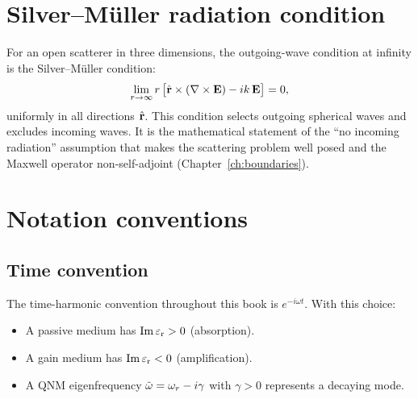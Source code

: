\section{Silver--M\"uller radiation condition}
\label{sec:silver-muller}

For an open scatterer in three dimensions, the outgoing-wave condition
at infinity is the Silver--M\"uller condition:
\begin{equation}
 \lim_{r\to\infty} r\,\bigl[
 \hat{\mathbf{r}}\times(\nabla\times\mathbf{E}) - ik\,\mathbf{E}
 \bigr] = 0,
 \label{eq:silver-muller-app}
\end{equation}
uniformly in all directions $\hat{\mathbf{r}}$. This condition selects
outgoing spherical waves and excludes incoming waves. It is the
mathematical statement of the ``no incoming radiation'' assumption that
makes the scattering problem well posed and the Maxwell operator
non-self-adjoint (Chapter~\ref{ch:boundaries}).


\section{Notation conventions}
\label{sec:notation}

\subsection{Time convention}
The time-harmonic convention throughout this book is
$e^{-i\omega t}$. With this choice:
\begin{itemize}
 \item A passive medium has $\operatorname{Im}\varepsilon_{\mathrm{r}} > 0$ (absorption).
 \item A gain medium has $\operatorname{Im}\varepsilon_{\mathrm{r}} < 0$ (amplification).
 \item A QNM eigenfrequency $\tilde{\omega} = \omega_r - i\gamma$ with
 $\gamma > 0$ represents a decaying mode.
\end{itemize}

